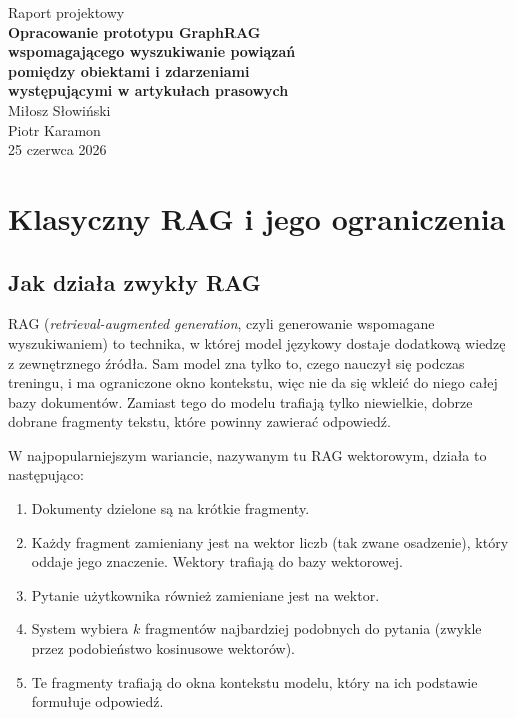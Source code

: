 \documentclass[11pt,a4paper]{article}
\begin{document}
\begin{titlepage}
\centering
\vspace*{3cm}

{\color{Slate}\large Raport projektowy}\\[2.5cm]

{\color{Navy}\LARGE\bfseries Opracowanie prototypu GraphRAG\\[0.5em]
wspomagającego wyszukiwanie powiązań\\[0.5em]
pomiędzy obiektami i zdarzeniami\\[0.5em]
występującymi w artykułach prasowych}\\[3.5cm]

{\large
Miłosz Słowiński\\[0.4em]
Piotr Karamon
}\\[3cm]

{\color{Slate} 25 czerwca 2026}

\vfill
\end{titlepage}

\tableofcontents
\newpage

\section{Klasyczny RAG i jego ograniczenia}

\subsection{Jak działa zwykły RAG}

RAG (\textit{retrieval-augmented generation}, czyli generowanie wspomagane wyszukiwaniem)
to technika, w której model językowy dostaje dodatkową wiedzę z zewnętrznego źródła. Sam
model zna tylko to, czego nauczył się podczas treningu, i ma ograniczone okno kontekstu, więc
nie da się wkleić do niego całej bazy dokumentów. Zamiast tego do modelu trafiają tylko
niewielkie, dobrze dobrane fragmenty tekstu, które powinny zawierać odpowiedź.

W najpopularniejszym wariancie, nazywanym tu RAG wektorowym, działa to następująco:

\begin{enumerate}[itemsep=2pt]
  \item Dokumenty dzielone są na krótkie fragmenty.
  \item Każdy fragment zamieniany jest na wektor liczb (tak zwane osadzenie),
        który oddaje jego znaczenie. Wektory trafiają do bazy wektorowej.
  \item Pytanie użytkownika również zamieniane jest na wektor.
  \item System wybiera $k$ fragmentów najbardziej podobnych do pytania (zwykle przez
        podobieństwo kosinusowe wektorów).
  \item Te fragmenty trafiają do okna kontekstu modelu, który na ich podstawie formułuje
        odpowiedź.
\end{enumerate}
\end{document}

